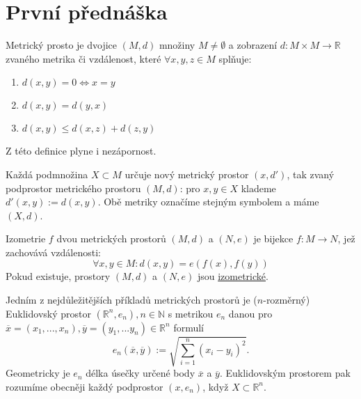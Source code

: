 \documentclass[../main.tex]{subfiles}
\begin{document}
\section{První přednáška}

\begin{definition}
    Metrický prosto je dvojice $(M,d)$ množiny $M\neq \emptyset$ a
    zobrazení $d: M \times M \to \mathbb{R}$ zvaného metrika či vzdálenost, které
    $\forall x,y,z \in M$ splňuje:
    \begin{enumerate}
        \item
        $d(x,y) = 0 \Leftrightarrow x=y$
        \item
        $d(x,y) = d(y,x)$
        \item
        $d(x,y)\leq d(x,z) + d(z,y)$
    \end{enumerate}

    \noindent
    Z této definice plyne i nezápornost.
\end{definition}

\begin{definition}[Podprostor]
    Každá podmnožina $X \subset M$ určuje nový metrický prostor $(x,d')$, tak zvaný
    podprostor metrického prostoru $(M,d)$: pro $x,y \in X$ klademe
    $d'(x,y) := d(x,y)$. Obě metriky označíme stejným symbolem a máme $(X,d)$.
\end{definition}

\begin{definition}[Izometrie $f$]
    Izometrie $f$ dvou metrických prostorů $(M,d)$ a $(N,e)$ je bijekce
    $f:M\to N$, jež zachovává vzdálenosti:
    \[ \forall x,y \in M: d(x,y) = e(f(x), f(y)) \]
    Pokud existuje, prostory $(M,d)$ a $(N,e)$ jsou \underline{izometrické}.
\end{definition}

\begin{example}
    Jedním z nejdůležitějších příkladů metrických prostorů je ($n$-rozměrný)
    Euklidovský prostor $(\mathbb{R}^n, e_n), n \in \mathbb{N}$ s metrikou
    $e_n$ danou pro
    $\overline{x} = (x_1, ..., x_n), \overline{y} = (y_1, ... y_n) \in \mathbb{R}^n$
    formulí \[ e_n(\overline{x}, \overline{y}) := \sqrt{\sum^n_{i=1}(x_i-y_i)^2}. \]
    Geometricky je $e_n$ délka úsečky určené body $\overline{x}$ a $\overline{y}$.
    Euklidovským prostorem pak rozumíme obecněji každý podprostor $(x,e_n)$, když
    $X \subset \mathbb{R}^n$.
\end{example}
\end{document}
